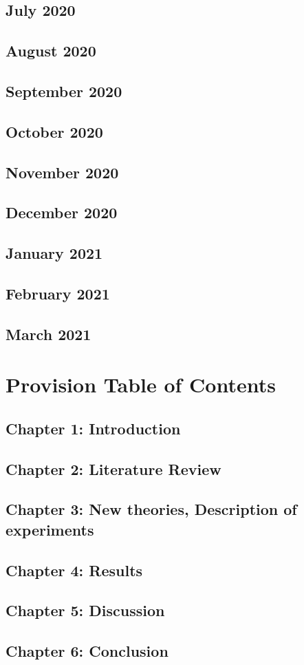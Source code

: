 \documentclass{article}
\begin{document}
	\subsection{July 2020}
	
	\subsection{August 2020}
	
	\subsection{September 2020}
	
	\subsection{October 2020}
	
	\subsection{November 2020}
	
	\subsection{December 2020}
	
	\subsection{January 2021}
	
	\subsection{February 2021}
	
	\subsection{March 2021}
	
	\section{Provision Table of Contents}
	\subsection{Chapter 1: Introduction}
	\subsection{Chapter 2: Literature Review}
	\subsection{Chapter 3: New theories, Description of experiments}
	\subsection{Chapter 4: Results}
	\subsection{Chapter 5: Discussion}
	\subsection{Chapter 6: Conclusion}
	
	
	
\end{document}
